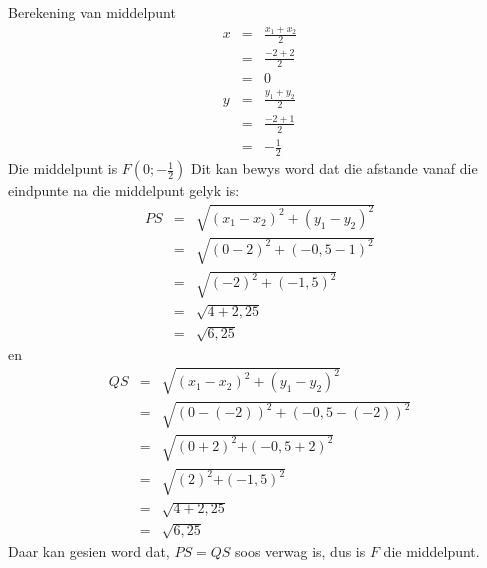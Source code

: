 \begin{wex}{Berekening van middelpunt}
{\begin{eqnarray*}
x& = & \frac{{x}_{1} + {x}_{2}}{2} \\ 
& = & \frac{-2 + 2}{2} \\ 
& = & 0 \\ 
y & = & \frac{{y}_{1} + {y}_{2}}{2} \\ 
& = & \frac{-2 + 1}{2} \\ 
& = & -\frac{1}{2} 
\end{eqnarray*}
Die middelpunt is $F(0;-\frac{1}{2})$
Dit kan bewys word dat die afstande vanaf die eindpunte na die middelpunt gelyk is: 
\begin{eqnarray*}
PS & = & \sqrt{{({x}_{1} - {x}_{2})}^{2} + {({y}_{1} - {y}_{2})}^{2}} \\ 
& = & \sqrt{{(0 - 2)}^{2} + {(-0,5 - 1)}^{2}} \\ 
& = & \sqrt{{(-2)}^{2} + {(-1,5)}^{2}} \\ 
& = & \sqrt{4 + 2,25} \\ 
& = & \sqrt{6,25}
\end{eqnarray*}
en
\begin{eqnarray*}
QS & = & \sqrt{{({x}_{1} - {x}_{2})}^{2} + {({y}_{1} - {y}_{2})}^{2}} \\ 
& = & \sqrt{{(0 - (-2))}^{2} + {(-0,5 - (-2))}^{2}} \\ 
& = & \sqrt{{(0 + 2)}^{2}{+(-0,5 + 2)}^{2}} \\ 
& = & \sqrt{{(2)}^{2}{+(-1,5)}^{2}} \\ 
& = & \sqrt{4 + 2,25} \\ 
& = & \sqrt{6,25}
\end{eqnarray*}
Daar kan gesien word dat, $PS=QS$ soos verwag is, dus is $F$ die middelpunt. 
}
\end{wex}

